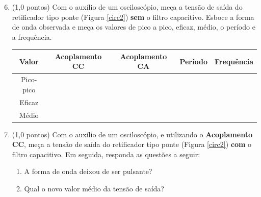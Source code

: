 \documentclass[11pt]{article}
\begin{document}
\begin{enumerate}
\setcounter{enumi}{5}

\item (1,0 pontos) Com o auxílio de um osciloscópio, meça a tensão de saída do retificador tipo ponte (Figura \ref{circ2}) \textbf{sem} o filtro capacitivo. Esboce a forma de onda observada e meça os valores de pico a pico, eficaz, médio, o período e a frequência.

\begin{figure}[!h]
	\centering
\end{figure}

\begin{table}[!h]
\centering
\begin{tabular}{|c|c|c|c|c|}
\hline
Valor & Acoplamento CC & Acoplamento CA & Período & Frequência\\\hline
Pico-pico & & & & \\\cline{1-3}
Eficaz & & & & \\\cline{1-3}
Médio & & & & \\\hline
\end{tabular}
\end{table}

\item (1,0 pontos) Com o auxílio de um osciloscópio, e utilizando o \textbf{Acoplamento CC}, meça a tensão de saída do retificador tipo ponte (Figura \ref{circ2}) \textbf{com} o filtro capacitivo. Em seguida, responda as questões a seguir:

\begin{enumerate}
\item A forma de onda deixou de ser pulsante?
\item Qual o novo valor médio da tensão de saída?
\end{enumerate}

\end{enumerate}
\end{document}
